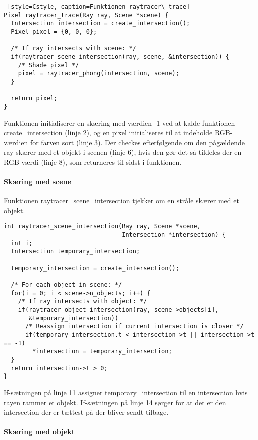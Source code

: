 \begin{lstlisting} [style=Cstyle, caption=Funktionen raytracer\_trace]
Pixel raytracer_trace(Ray ray, Scene *scene) {
  Intersection intersection = create_intersection();
  Pixel pixel = {0, 0, 0};
  
  /* If ray intersects with scene: */
  if(raytracer_scene_intersection(ray, scene, &intersection)) {
    /* Shade pixel */
    pixel = raytracer_phong(intersection, scene);
  }
  
  return pixel;
}
\end{lstlisting}
Funktionen initialiserer en skæring med værdien -1 ved at kalde funktionen create\_intersection (linje 2), og en pixel initialiseres til at indeholde RGB-værdien for farven sort (linje 3). Der checkes efterfølgende om den pågældende ray skærer med et objekt i scenen (linje 6), hvis den gør det så tildeles der en RGB-værdi (linje 8), som returneres til sidst i funktionen. 

\paragraph{Skæring med scene}

Funktionen raytracer\_scene\_intersection tjekker om en stråle skærer med et objekt.

\begin{lstlisting}[style=Cstyle, caption=Funktionen raytracer\_scene\_intersection]
int raytracer_scene_intersection(Ray ray, Scene *scene, 
                                 Intersection *intersection) {
  int i;
  Intersection temporary_intersection;

  temporary_intersection = create_intersection();

  /* For each object in scene: */
  for(i = 0; i < scene->n_objects; i++) {
    /* If ray intersects with object: */
    if(raytracer_object_intersection(ray, scene->objects[i], 
       &temporary_intersection))
      /* Reassign intersection if current intersection is closer */
      if(temporary_intersection.t < intersection->t || intersection->t == -1)
        *intersection = temporary_intersection;
  }
  return intersection->t > 0;
}
\end{lstlisting}

If-sætningen på linje 11 assigner temporary\_intersection til en intersection hvis rayen rammer et objekt. If-sætningen på linje 14 sørger for at det er den intersection der er tættest på der bliver sendt tilbage. 


\paragraph{Skæring med objekt}

